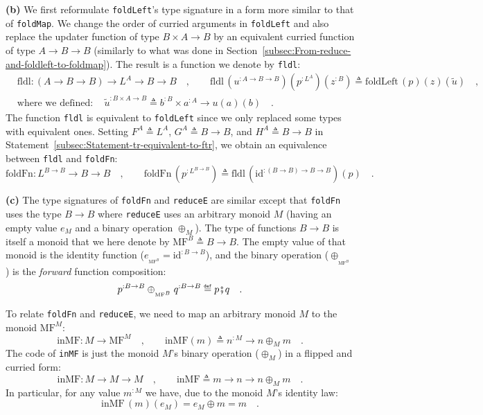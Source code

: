 \textbf{(b)} We first reformulate \lstinline!foldLeft!\textsf{'}s type signature
in a form more similar to that of \lstinline!foldMap!. We change
the order of curried arguments in \lstinline!foldLeft! and also replace
the updater function of type $B\times A\rightarrow B$ by an equivalent
curried function of type $A\rightarrow B\rightarrow B$ (similarly
to what was done in Section~\ref{subsec:From-reduce-and-foldleft-to-foldmap}).
The result is a function we denote by \lstinline!fldl!:
\begin{align*}
 & \text{fldl}:(A\rightarrow B\rightarrow B)\rightarrow L^{A}\rightarrow B\rightarrow B\quad,\quad\quad\text{fldl}\,(u^{:A\rightarrow B\rightarrow B})(p^{:L^{A}})(z^{:B})\triangleq\text{foldLeft}\,(p)(z)(\tilde{u})\quad,\\
 & \text{where we defined}:\quad\tilde{u}^{:B\times A\rightarrow B}\triangleq b^{:B}\times a^{:A}\rightarrow u\left(a\right)(b)\quad.
\end{align*}
The function \lstinline!fldl! is equivalent to \lstinline!foldLeft!
since we only replaced some types with equivalent ones. Setting $F^{A}\triangleq L^{A}$,
$G^{A}\triangleq B\rightarrow B$, and $H^{A}\triangleq B\rightarrow B$
in Statement~\ref{subsec:Statement-tr-equivalent-to-ftr}, we obtain
an equivalence between \lstinline!fldl! and \lstinline!foldFn!:
\[
\text{foldFn}:L^{B\rightarrow B}\rightarrow B\rightarrow B\quad,\quad\quad\text{foldFn}\,(p^{:L^{B\rightarrow B}})\triangleq\text{fldl}\,(\text{id}^{:(B\rightarrow B)\rightarrow B\rightarrow B})(p)\quad.
\]

\textbf{(c)} The type signatures of \lstinline!foldFn! and \lstinline!reduceE!
are similar except that \lstinline!foldFn! uses the type $B\rightarrow B$
where \lstinline!reduceE! uses an arbitrary monoid $M$ (having an
empty value $e_{M}$ and a binary operation $\oplus_{M}$). The type
of functions $B\rightarrow B$ is itself a monoid that we here denote
by $\text{MF}^{B}\triangleq B\rightarrow B$. The empty value of that
monoid is the identity function ($e_{_{\text{MF}^{B}}}=\text{id}^{:B\rightarrow B}$),
and the binary operation ($\ensuremath{\oplus}_{_{\text{MF}^{B}}}$)
is the \emph{forward} function composition: 
\[
p^{:B\rightarrow B}\oplus_{_{\text{MF}^{B}}}q^{:B\rightarrow B}\triangleq p\bef q\quad.
\]

To relate \lstinline!foldFn! and \lstinline!reduceE!, we need to
map an arbitrary monoid $M$ to the monoid $\text{MF}^{M}$:
\[
\text{inMF}:M\rightarrow\text{MF}^{M}\quad,\quad\quad\text{inMF}\left(m\right)\triangleq n^{:M}\rightarrow n\oplus_{M}m\quad.
\]
The code of \lstinline!inMF! is just the monoid $M$\textsf{'}s binary operation
($\oplus_{M}$) in a flipped and curried form:
\[
\text{inMF}:M\rightarrow M\rightarrow M\quad,\quad\quad\text{inMF}\triangleq m\rightarrow n\rightarrow n\oplus_{M}m\quad.
\]
In particular, for any value $m^{:M}$ we have, due to the monoid
$M$\textsf{'}s identity law: 
\begin{equation}
\text{inMF}\,(m)(e_{M})=e_{M}\oplus m=m\quad.\label{eq:identity-law-of-inMF}
\end{equation}

